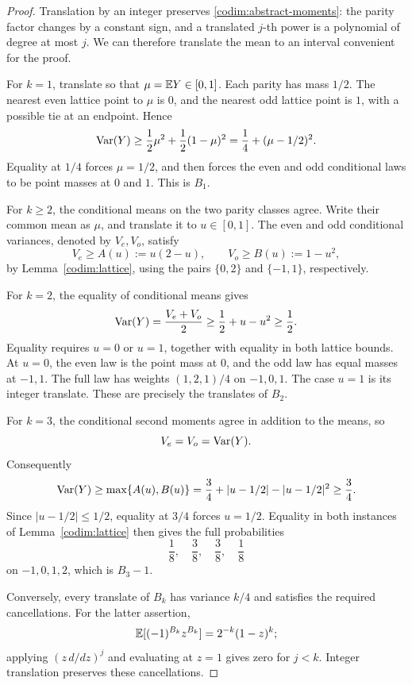 \begin{proof}
Translation by an integer preserves
\eqref{codim:abstract-moments}: the parity factor changes by a constant
sign, and a translated \(j\)-th power is a polynomial of degree at most
\(j\).  We can therefore translate the mean to an interval convenient
for the proof.

For \(k=1\), translate so that \(\mu=\mathbb E Y\in[0,1]\).  Each parity
has mass \(1/2\).  The nearest even lattice point to \(\mu\) is \(0\),
and the nearest odd lattice point is \(1\), with a possible tie at an
endpoint.  Hence
\[
\operatorname{Var}(Y)
\ge \frac12\mu^2+\frac12(1-\mu)^2
=\frac14+(\mu-1/2)^2.
\]
Equality at \(1/4\) forces \(\mu=1/2\), and then forces the even
and odd conditional laws to be point masses at \(0\) and \(1\).
This is \(B_1\).

For \(k\ge2\), the conditional means on the two parity classes
agree.  Write their common mean as \(\mu\), and translate it to
\(u\in[0,1]\).  The even and odd conditional variances, denoted by
\(V_e,V_o\), satisfy
\begin{equation}
\label{codim:AB}
V_e\ge A(u):=u(2-u),
\qquad
V_o\ge B(u):=1-u^2,
\end{equation}
by Lemma~\ref{codim:lattice}, using the pairs \(\{0,2\}\) and
\(\{-1,1\}\), respectively.

For \(k=2\), the equality of conditional means gives
\[
\operatorname{Var}(Y)=\frac{V_e+V_o}{2}
\ge\frac12+u-u^2
\ge\frac12.
\]
Equality requires \(u=0\) or \(u=1\), together with equality in
both lattice bounds.  At \(u=0\), the even law is the point mass at
\(0\), and the odd law has equal masses at \(-1,1\).
The full law has weights \((1,2,1)/4\) on \(-1,0,1\).
The case \(u=1\) is its integer translate.  These are precisely
the translates of \(B_2\).

For \(k=3\), the conditional second moments agree in addition to
the means, so
\[
V_e=V_o=\operatorname{Var}(Y).
\]
Consequently
\[
\operatorname{Var}(Y)\ge\max\{A(u),B(u)\}
=\frac34+|u-1/2|-|u-1/2|^2
\ge\frac34.
\]
Since \(|u-1/2|\le1/2\), equality at \(3/4\) forces \(u=1/2\).
Equality in both instances of Lemma~\ref{codim:lattice} then gives
the full probabilities
\[
\frac18,\quad\frac38,\quad\frac38,\quad\frac18
\]
on \(-1,0,1,2\), which is \(B_3-1\).

Conversely, every translate of \(B_k\) has variance \(k/4\)
and satisfies the required cancellations.  For the latter assertion,
\[
\mathbb E[(-1)^{B_k}z^{B_k}]=2^{-k}(1-z)^k;
\]
applying \((z\,d/dz)^j\) and evaluating at \(z=1\) gives zero for
\(j<k\).  Integer translation preserves these cancellations.
\end{proof}

